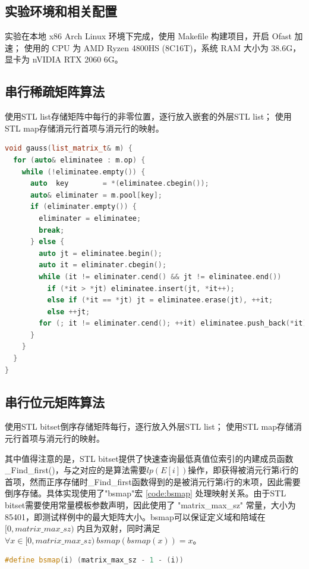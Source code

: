\documentclass[a4paper]{article}
\begin{document}
\subsection{实验环境和相关配置}
实验在本地 x86 Arch Linux 环境下完成，使用 Makefile 构建项目，开启 Ofast 加速；
使用的 CPU 为 AMD Ryzen 4800HS (8C16T)，系统 RAM 大小为 38.6G，显卡为 nVIDIA RTX 2060 6G。

\subsection{串行稀疏矩阵算法}
使用STL list存储矩阵中每行的非零位置，逐行放入嵌套的外层STL list；
使用STL map存储消元行首项与消元行的映射。

\begin{lstlisting}[frame=trbl, language={C++}, caption={串行稀疏矩阵消元部分}]
void gauss(list_matrix_t& m) {
  for (auto& eliminatee : m.op) {
    while (!eliminatee.empty()) {
      auto  key        = *(eliminatee.cbegin());
      auto& eliminater = m.pool[key];
      if (eliminater.empty()) {
        eliminater = eliminatee;
        break;
      } else {
        auto jt = eliminatee.begin();
        auto it = eliminater.cbegin();
        while (it != eliminater.cend() && jt != eliminatee.end())
          if (*it > *jt) eliminatee.insert(jt, *it++);
          else if (*it == *jt) jt = eliminatee.erase(jt), ++it;
          else ++jt;
        for (; it != eliminater.cend(); ++it) eliminatee.push_back(*it);
      }
    }
  }
}
\end{lstlisting}

\subsection{串行位元矩阵算法}
使用STL bitset倒序存储矩阵每行，逐行放入外层STL list；
使用STL map存储消元行首项与消元行的映射。

其中值得注意的是，STL bitset提供了快速查询最低真值位索引的内建成员函数\_Find\_first()，与之对应的是算法需要$lp(E[i])$操作，即获得被消元行第i行的首项，然而正序存储时\_Find\_first函数得到的是被消元行第i行的末项，因此需要倒序存储。具体实现使用了"bsmap"宏 \ref{code:bsmap} 处理映射关系。由于STL bitset需要使用常量模板参数声明，因此使用了 "matrix\_max\_sz" 常量，大小为 85401，即测试样例中的最大矩阵大小。bsmap可以保证定义域和陪域在 $[0, matrix\_max\_sz)$ 内且为双射，同时满足 $\forall{x \in [0, matrix\_max\_sz)}\ bsmap(bsmap(x)) = x$。
\begin{lstlisting}[frame=trbl, language={C++}, caption={bsmap 宏}, label = {code:bsmap}]
#define bsmap(i) (matrix_max_sz - 1 - (i))
\end{lstlisting}
\end{document}
